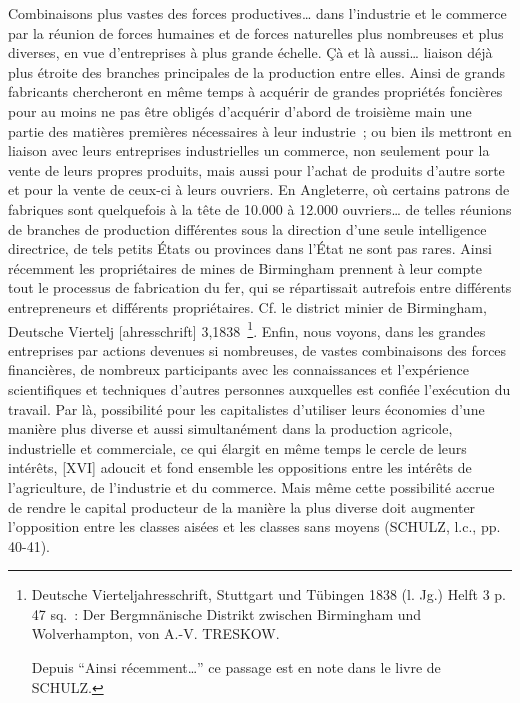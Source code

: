 \documentclass[french,twoside]{book} %
\newenvironment{quoteblock}%
  {\begin{quoting}}
  {\end{quoting}}
\newenvironment{quotebar}{%
    \def\FrameCommand{{\color{rubric!10!}\vrule width 0.5em} \hspace{0.9em}}%
    \def\OuterFrameSep{\itemsep} %
    \MakeFramed {\advance\hsize-\width \FrameRestore}
  }%
  {%
    \endMakeFramed
  }
\renewenvironment{quoteblock}%
  {%
    \savenotes
    \setstretch{0.9}
    \normalfont
    \begin{quotebar}
  }
  {%
    \end{quotebar}
    \spewnotes
  }
\begin{document}
\begin{quoteblock}
 \noindent Combinaisons plus vastes des forces productives… dans l’industrie et le commerce par la réunion de forces humaines et de forces naturelles plus nombreuses et plus diverses, en vue d’entreprises à plus grande échelle. Çà et là aussi… liaison déjà plus étroite des branches principales de la production entre elles. Ainsi de grands fabricants chercheront en même temps à acquérir de grandes propriétés foncières pour au moins ne pas être obligés d’acquérir d’abord de troisième main une partie des matières premières nécessaires à leur industrie ; ou bien ils mettront en liaison avec leurs entreprises industrielles un commerce, non seulement pour la vente de leurs propres produits, mais aussi pour l’achat de produits d’autre sorte et pour la vente de ceux-ci à leurs ouvriers. En Angleterre, où certains patrons de fabriques sont quelquefois à la tête de 10.000 à 12.000 ouvriers… de telles réunions de branches de production différentes sous la direction d’une seule intelligence directrice, de tels petits États ou provinces dans l’État ne sont pas rares. Ainsi récemment les propriétaires de mines de Birmingham prennent à leur compte tout le processus de fabrication du fer, qui se répartissait autrefois entre différents entrepreneurs et différents propriétaires. Cf. le district minier de Birmingham, Deutsche Viertelj [ahresschrift] 3,1838 \footnote{ \noindent Deutsche Vierteljahresschrift, Stuttgart und Tübingen 1838 (l. Jg.) Helft 3 p. 47 sq. : Der Bergmnänische Distrikt zwischen Birmingham und Wolverhampton, von A.-V. TRESKOW.\par
 Depuis “Ainsi récemment…” ce passage est en note dans le livre de SCHULZ.
}. Enfin, nous voyons, dans les grandes entreprises par actions devenues si nombreuses, de vastes combinaisons des forces financières, de nombreux participants avec les connaissances et l’expérience scientifiques et techniques d’autres personnes auxquelles est confiée l’exécution du travail. Par là, possibilité pour les capitalistes d’utiliser leurs économies d’une manière plus diverse et aussi simultanément dans la production agricole, industrielle et commerciale, ce qui élargit en même temps le cercle de leurs intérêts, [XVI] adoucit et fond ensemble les oppositions entre les intérêts de l’agriculture, de l’industrie et du commerce. Mais même cette possibilité accrue de rendre le capital producteur de la manière la plus diverse doit augmenter l’opposition entre les classes aisées et les classes sans moyens (SCHULZ, l.c., pp. 40-41).
 \end{quoteblock}
\end{document}

